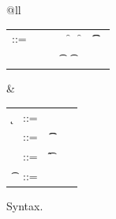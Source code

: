 \documentclass[acmsmall, anonymous, authordraft, review]{acmart} %
\begin{document}
\begin{figure}[!h]\hrulefill

\vspace{4mm}

\small\begin{tabular}{@{}ll}

\begin{minipage}{9cm}\begin{tabular}{@{}l@{~}l@{}l@{}l@{}l@{}l@{}l@{}l}
\e\hspace{.1cm} ::= & \hspace{.2cm} \x        
    &\B \this         
   &\B \that      
   &\B \FRead\f     
   &\B \FWrite\f\e   
   &\B \KCall\e\m\e\t\t \\
   & &
   &\B \SubCast\t\e 
   &\B \BehCast\t\e 
   &\B \New\C{\e[1]..}  
   &\B \DynCall\e\m\e 
\end{tabular}\end{minipage}&
\begin{minipage}{3.4cm}\begin{tabular}{l@{~}l@{}l@{}l}
  \k &::= \Class \C {\fd[1]..}{\md[1]..} \\
 \md &::= ~ \Mdef\m\x\t\t\e \\ 
 \fd &::= ~ \Fdef\f\t \\ 
  \t &::= ~ \any  \B   \C  \\ 
\end{tabular}\end{minipage} 
\end{tabular}

\vspace{4mm}

\noindent\hrulefill
\caption{\kafka Syntax.}\label{syn}
\end{figure}
\end{document}
